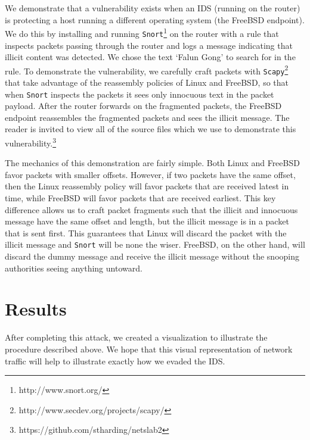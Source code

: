 \documentclass[]{article}
\begin{document}
We demonstrate that a vulnerability exists when an IDS (running on the router) 
is protecting a host running a different operating system (the FreeBSD 
endpoint). We do this by installing and running 
\texttt{Snort}\footnote{http://www.snort.org/} on the router with a rule that 
inspects packets passing through the router and logs a message indicating that 
illicit content was detected. We chose the text `Falun Gong' to search for in 
the rule. To demonstrate the vulnerability, we carefully craft packets with 
\texttt{Scapy}\footnote{http://www.secdev.org/projects/scapy/} that take 
advantage of the reassembly policies of Linux and FreeBSD, so that when 
\texttt{Snort} inspects the packets it sees only innocuous text in the packet 
payload. After the router forwards on the fragmented packets, the FreeBSD 
endpoint reassembles the fragmented packets and sees the illicit message. The 
reader is invited to view all of the source files which we use to demonstrate 
this vulnerability.\footnote{https://github.com/stharding/netslab2}

The mechanics of this demonstration are fairly simple. Both Linux and FreeBSD 
favor packets with smaller offsets. However, if two packets have the same 
offset, then the Linux reassembly policy will favor packets that are received 
latest in time, while FreeBSD will favor packets that are received earliest. 
This key difference allows us to craft packet fragments such that the illicit 
and innocuous message have the same offset and length, but the illicit message 
is in a packet that is sent first. This guarantees that Linux will discard the 
packet with the illicit message and \texttt{Snort} will be none the wiser. 
FreeBSD, on the other hand, will discard the dummy message and receive the 
illicit message without the snooping authorities seeing anything untoward.

\section{Results}

After completing this attack, we created a visualization to illustrate the 
procedure described above. We hope that this visual representation of network 
traffic will help to illustrate exactly how we evaded the IDS.
\end{document}
